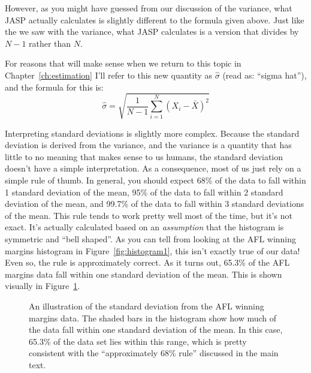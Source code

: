 However, as you might have guessed from our discussion of the variance, what JASP actually calculates is slightly different to the formula given above. Just like the we saw with the variance, what JASP calculates is a version that divides by $N-1$ rather than $N$. 

\vspace{0.5cm}
\begin{mdframed}[style=MyFrame,nobreak=true]
For reasons that will make sense when we return to this topic in Chapter~\ref{ch:estimation} I'll refer to this new quantity as $\hat\sigma$ (read as: ``sigma hat''), and the formula for this is:
$$
\hat\sigma = \sqrt{ \frac{1}{N-1} \sum_{i=1}^N \left( X_i - \bar{X} \right)^2 }
$$

\end{mdframed}

Interpreting standard deviations is slightly more complex. Because the standard deviation is derived from the variance, and the variance is a quantity that has little to no meaning that makes sense to us humans, the standard deviation doesn't have a simple interpretation. As a consequence, most of us just rely on a simple rule of thumb. In general, you should expect 68\% of the data to fall within 1 standard deviation of the mean, 95\% of the data to fall within 2 standard deviation of the mean, and 99.7\% of the data to fall within 3 standard deviations of the mean. This rule tends to work pretty well most of the time, but it's not exact. It's actually calculated based on an {\it assumption} that the histogram is symmetric and ``bell shaped''. As you can tell from looking at the AFL winning margins histogram in Figure~\ref{fig:histogram1}, this isn't exactly true of our data! Even so, the rule is approximately correct. As it turns out, 65.3\% of the AFL margins data fall within one standard deviation of the mean. This is shown visually in Figure~\ref{fig:aflsd}.

\begin{figure}[htb]
\begin{center}
\caption{An illustration of the standard deviation from the AFL winning margins data. The shaded bars in the histogram show how much of the data fall within one standard deviation of the mean. In this case, 65.3\% of the data set lies within this range, which is pretty consistent with the ``approximately 68\% rule'' discussed in the main text.}
\label{fig:aflsd}
\HR
\end{center}
\end{figure}

